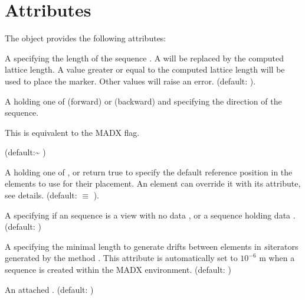 \documentclass[letterpaper,10pt,english]{sphinxmanual}
\begin{document}
\section{Attributes}
\label{\detokenize{sequences:attributes}}
\sphinxAtStartPar
The  object provides the following attributes:
\begin{description}
\sphinxAtStartPar
A  specifying the length of the sequence \sphinxcode{\sphinxupquote{{[}m{]}}}. A  will be replaced by the computed lattice length. A value greater or equal to the computed lattice length will be used to place the  marker. Other values will raise an error. (default: ).

\sphinxAtStartPar
A  holding one of  (forward) or  (backward) and specifying the direction of the sequence. %
\begin{footnote}[1]\sphinxAtStartFootnote
This is equivalent to the MAD\sphinxhyphen{}X  flag.
%
\end{footnote} (default:\textasciitilde{} )

\sphinxAtStartPar
A  holding one of ,  or    return true  to specify the default reference position in the elements to use for their placement. An element can override it with its  attribute, see {\hyperref[\detokenize{sequences:element-positions}]{}} details. (default:  \(\equiv\) ).

\sphinxAtStartPar
A  specifying if an  sequence is a view with no data , or a sequence holding data . (default: )

\sphinxAtStartPar
A  specifying the minimal length \sphinxcode{\sphinxupquote{{[}m{]}}} to generate  drifts between elements in \(s\)\sphinxhyphen{}iterators generated by the method . This attribute is automatically set to \(10^{-6}\) m when a sequence is created within the MADX environment. (default: )

\sphinxAtStartPar
An attached . (default: )

\end{description}
\end{document}
